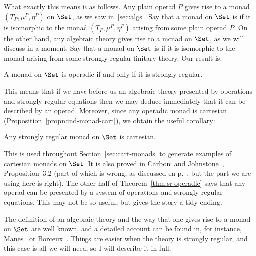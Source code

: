What exactly this means is as follows.  Any plain operad $P$ gives rise
to a monad $(T_P, \mu^P, \eta^P)$ on $\Set$, as we saw in~\ref{sec:algs}.
Say that a monad on $\Set$ is %
%
%
if it is isomorphic to the
monad $(T_P, \mu^P, \eta^P)$ arising from some plain operad $P$.  On
the other hand, any algebraic theory gives rise to a monad on $\Set$, as we
will discuss in a moment.  Say that a monad on $\Set$ is %
%
%
%
%
if it is isomorphic to the monad arising from some strongly
regular finitary theory.  Our result is:
%
\begin{thm}	
A monad on $\Set$ is operadic if and only if it is strongly regular. 
\end{thm}
%
This means that if we have before us an algebraic theory presented by
operations and strongly regular equations then we may deduce immediately
that it can be described by an operad.  Moreover, since any operadic monad
is cartesian (Proposition~\ref{propn:ind-monad-cart}), we obtain the useful
corollary:
%
\begin{cor}
Any strongly regular monad on $\Set$ is cartesian.  
\done
\end{cor}
%
This is used throughout Section~\ref{sec:cart-monads} to generate examples
of cartesian monads on $\Set$.  It is also proved in Carboni and
Johnstone~\cite{CJ}, Proposition~3.2 (part of which is wrong, as discussed
on p.~\pageref{p:CJ-error}, but the part we are using here is right).  The
other half of Theorem~\ref{thm:sr-operadic} says that any operad can be
presented by a system of operations and strongly regular equations.  This
may not be so useful, but gives the story a tidy ending.

The definition of an algebraic theory and the way that one gives rise to a
monad on $\Set$ are well known, and a detailed account can be found in, for
instance, Manes~\cite{Manes} or Borceux~\cite{Borx2}.  Things are easier
when the theory is strongly regular, and this case is all we will need, so
I will describe it in full.


